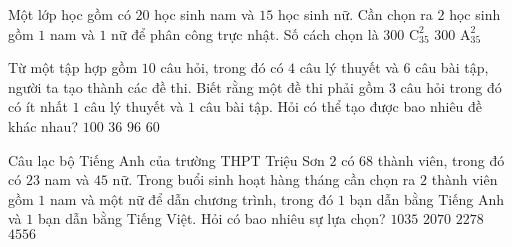 \begin{ex}%
	Một lớp học gồm có $20$ học sinh nam và $15$ học sinh nữ. Cần chọn ra $2$ học sinh gồm $1$ nam và $1$ nữ để phân công trực nhật. Số cách chọn là
	\choice
	{\True $300$}
	{$\mathrm{C}_{35}^2$}
	{$300$}
	{$\mathrm{A}_{35}^2$}
\end{ex}

\begin{ex}%
	Từ một tập hợp gồm $ 10 $ câu hỏi, trong đó có $ 4 $ câu lý thuyết và $ 6 $ câu bài tập, người ta tạo thành các đề thi. Biết rằng một đề thi phải gồm $ 3 $ câu hỏi trong đó có ít nhất $ 1 $ câu lý thuyết và $ 1 $ câu bài tập. Hỏi có thể tạo được bao nhiêu đề khác nhau?
	\choice
	{$ 100 $}
	{$ 36 $}
	{\True $ 96 $}
	{$ 60 $}
\end{ex}
\begin{ex}%
	Câu lạc bộ Tiếng Anh của trường THPT Triệu Sơn $2$ có $68$ thành viên, trong đó có $23$ nam và $45$ nữ. Trong buổi sinh hoạt hàng tháng cần chọn ra $2$ thành viên gồm $1$ nam và một nữ để dẫn chương trình, trong đó $1$ bạn dẫn bằng Tiếng Anh và $1$ bạn dẫn bằng Tiếng Việt. Hỏi có bao nhiêu sự lựa chọn?
	\choice
	{$1035$}
	{\True $2070$}
	{$2278$}
	{$4556$}
\end{ex}
